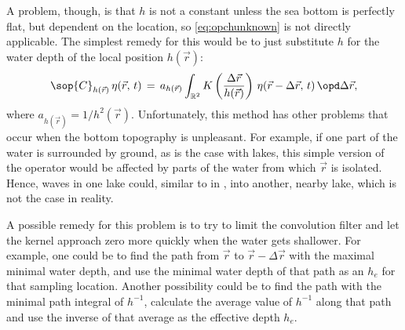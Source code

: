 A problem, though, is that $h$ is not a constant unless the sea bottom is perfectly flat, but dependent on the location, so \eqref{eq:opchunknown} is not directly applicable. The simplest remedy for this would be to just substitute $h$ for the water depth of the local position $h(\vec{r})$:
%
\begin{equation} \label{eq:opchlocal}
\sop{C}_{h(\vec{r})}\,\eta(\vec{r},\,t) \,=\, a_{h(\vec{r})}\int_{\mathbb{R}^2}K\left(\frac{\Delta\vec{r}}{h(\vec{r})}\right)\,\eta(\vec{r}-\Delta\vec{r},\,t)\,\opd\Delta\vec{r},
\end{equation}
%
where $a_{h(\vec{r})} = 1/h^2(\vec{r})$. Unfortunately, this method has other problems that occur when the bottom topography is unpleasant. For example, if one part of the water is surrounded by ground, as is the case with lakes, this simple version of the operator would be affected by parts of the water from which $\vec{r}$ is isolated. Hence, waves in one lake could, similar to in , \tunnel into another, nearby lake, which is not the case in reality.

A possible remedy for this problem is to try to limit the convolution filter and let the kernel approach zero more quickly when the water gets shallower. For example, one could be to find the path from $\vec{r}$ to $\vec{r}-\Delta\vec{r}$ with the maximal minimal water depth, and use the minimal water depth of that path as an  $h_e$ for that sampling location. Another possibility could be to find the path with the minimal path integral of $h^{-1}$, calculate the average value of $h^{-1}$ along that path and use the inverse of that average as the effective depth $h_e$.



